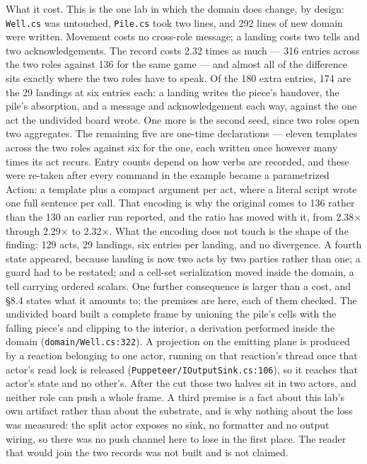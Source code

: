 \documentclass[
]{article}
\begin{document}
What it cost. This is the one lab in which the domain does change, by
design: \texttt{Well.cs} was untouched, \texttt{Pile.cs} took two lines,
and 292 lines of new domain were written. Movement costs no cross-role
message; a landing costs two tells and two acknowledgements. The record
costs 2.32 times as much --- 316 entries across the two roles against
136 for the same game --- and almost all of the difference sits exactly
where the two roles have to speak. Of the 180 extra entries, 174 are the
29 landings at six entries each: a landing writes the piece's handover,
the pile's absorption, and a message and acknowledgement each way,
against the one act the undivided board wrote. One more is the second
seed, since two roles open two aggregates. The remaining five are
one-time declarations --- eleven templates across the two roles against
six for the one, each written once however many times its act recurs.
Entry counts depend on how verbs are recorded, and these were re-taken
after every command in the example became a parametrized Action: a
template plus a compact argument per act, where a literal script wrote
one full sentence per call. That encoding is why the original comes to
136 rather than the 130 an earlier run reported, and the ratio has moved
with it, from 2.38× through 2.29× to 2.32×. What the encoding does not
touch is the shape of the finding: 129 acts, 29 landings, six entries
per landing, and no divergence. A fourth state appeared, because landing
is now two acts by two parties rather than one; a guard had to be
restated; and a cell-set serialization moved inside the domain, a tell
carrying ordered scalars. One further consequence is larger than a cost,
and §8.4 states what it amounts to; the premises are here, each of them
checked. The undivided board built a complete frame by unioning the
pile's cells with the falling piece's and clipping to the interior, a
derivation performed inside the domain (\texttt{domain/Well.cs:322}). A
projection on the emitting plane is produced by a reaction belonging to
one actor, running on that reaction's thread once that actor's read lock
is released (\texttt{Puppeteer/IOutputSink.cs:106}), so it reaches that
actor's state and no other's. After the cut those two halves sit in two
actors, and neither role can push a whole frame. A third premise is a
fact about this lab's own artifact rather than about the substrate, and
is why nothing about the loss was measured: the split actor exposes no
sink, no formatter and no output wiring, so there was no push channel
here to lose in the first place. The reader that would join the two
records was not built and is not claimed.
\end{document}
